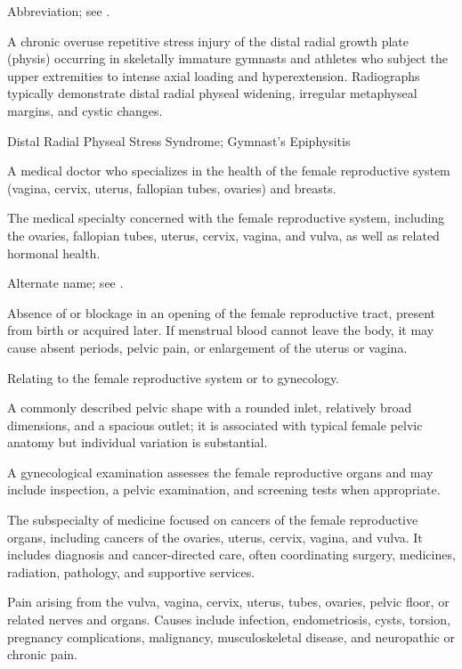 Abbreviation; see .

 A chronic overuse repetitive stress injury of the distal radial growth plate (physis) occurring in skeletally immature gymnasts and athletes who subject the upper extremities to intense axial loading and hyperextension. Radiographs typically demonstrate distal radial physeal widening, irregular metaphyseal margins, and cystic changes.

\synonyms
Distal Radial Physeal Stress Syndrome; Gymnast's Epiphysitis

 A medical doctor who specializes in the health of the female reproductive system
(vagina, cervix, uterus, fallopian tubes, ovaries) and breasts.

 The medical specialty concerned with the female reproductive system, including the ovaries, fallopian tubes, uterus, cervix, vagina, and vulva, as well as related hormonal health.

 Alternate name; see .

 Absence of or blockage in an opening of the female reproductive tract, present from birth or acquired later. If menstrual blood cannot leave the body, it may cause absent periods, pelvic pain, or enlargement of the uterus or vagina.

 Relating to the female reproductive system or to gynecology.

 A commonly described pelvic shape with a rounded inlet, relatively broad dimensions, and a spacious outlet; it is associated with typical female pelvic anatomy but individual variation is substantial.

 A gynecological examination assesses the female reproductive organs and may include inspection, a pelvic examination, and screening tests when appropriate.

 The subspecialty of medicine focused on cancers of the female reproductive
organs, including cancers of the ovaries, uterus, cervix, vagina, and vulva. It includes
diagnosis and cancer-directed care, often coordinating surgery, medicines, radiation,
pathology, and supportive services.

 Pain arising from the vulva, vagina, cervix, uterus, tubes, ovaries, pelvic floor, or related nerves and organs. Causes include infection, endometriosis, cysts, torsion, pregnancy complications, malignancy, musculoskeletal disease, and neuropathic or chronic pain.

